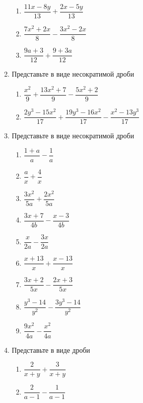 \documentclass[10pt, a4paper]{article}
\begin{document}
\begin{enumerate}
\begin{multicols}{3}
\begin{enumerate}
			\item $\dfrac{11x-8y}{13}+\dfrac{2x-5y}{13}$ 
			\item $\dfrac{7x^2+2x}{8}-\dfrac{3x^2-2x}{8}$ 
			\item $\dfrac{9a+3}{12}+\dfrac{9+3a}{12}$ 
		\end{enumerate}	
	\end{multicols}
	\item Представьте в виде несократимой дроби
	\begin{multicols}{2}
		\begin{enumerate}
			\item $\dfrac{x^2}{9}+\dfrac{13x^2+7}{9}-\dfrac{5x^2+2}{9}$ 
			\item $\dfrac{2y^3-15x^2}{17}+\dfrac{19y^3-16x^2}{17}-\dfrac{x^2-13y^3}{17}$ 
		\end{enumerate}	
	\end{multicols}
	\item Представьте в виде несократимой дроби
	\begin{multicols}{3}
		\begin{enumerate}
			\item $\dfrac{1+a}{a}-\dfrac{1}{a}$ 
			\item $\dfrac{a}{x}+\dfrac{4}{x}$ 
			\item $\dfrac{3x^2}{5a}+\dfrac{2x^2}{5a}$ 
			\item $\dfrac{3x+7}{4b}-\dfrac{x-3}{4b}$ 
			\item $\dfrac{x}{2a}-\dfrac{3x}{2a}$ 
			\item $\dfrac{x+13}{x}+\dfrac{x-13}{x}$ 
			\item $\dfrac{3x+2}{5x}-\dfrac{2x+3}{5x}$ 
			\item $\dfrac{y^3-14}{y^2}-\dfrac{3y^3-14}{y^2}$ 
			\item $\dfrac{9x^2}{4a}-\dfrac{x^2}{4a}$ 
		\end{enumerate}	
	\end{multicols}
	\item Представьте в виде дроби
	\begin{multicols}{3}
		\begin{enumerate}
			\item $\dfrac{2}{x+y}+\dfrac{3}{x+y}$ 
			\item $\dfrac{2}{a-1}-\dfrac{1}{a-1}$ 

\end{enumerate}
\end{multicols}
\end{enumerate}
\end{document}
